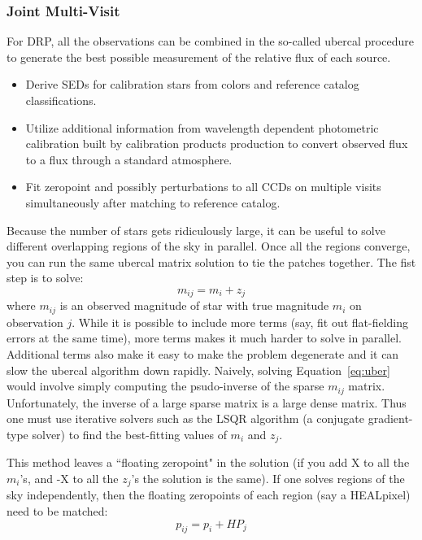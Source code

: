 \subsubsection{Joint Multi-Visit}
\label{sec:acJointPhotometricFit}

For DRP, all the observations can be combined in the so-called ubercal procedure to generate the best possible measurement of the relative flux of each source.

\begin{itemize}
\item Derive SEDs for calibration stars from colors and reference catalog classifications.
\item Utilize additional information from wavelength dependent photometric calibration built by calibration products production to convert observed flux to a flux through a standard atmosphere.
\item Fit zeropoint and possibly perturbations to all CCDs on multiple visits simultaneously after matching to reference catalog.
\end{itemize}

Because the number of stars gets ridiculously large, it can be useful to solve different overlapping regions of the sky in parallel.  Once all the regions converge, you can run the same ubercal matrix solution to tie the patches together.  The fist step is to solve:
\begin{equation} \label{eq:uber}
m_{ij} = m_i + z_j
\end{equation}
where $m_{ij}$ is an observed magnitude of star with true magnitude $m_i$ on observation $j$.  While it is possible to include more terms (say, fit out flat-fielding errors at the same time), more terms makes it much harder to solve in parallel.  Additional terms also make it easy to make the problem degenerate and it can slow the ubercal algorithm down rapidly. Naively, solving Equation~\ref{eq:uber} would involve simply computing the psudo-inverse of the sparse $m_{ij}$ matrix. Unfortunately, the inverse of a large sparse matrix is a large dense matrix.  Thus one must use iterative solvers such as the LSQR algorithm (a conjugate gradient-type solver) to find the best-fitting values of $m_i$ and $z_j$.  

This method leaves a ``floating zeropoint" in the solution (if you add X to all the $m_i$'s, and -X to all the $z_j$'s the solution is the same).  If one solves regions of the sky independently, then the floating zeropoints of each region (say a HEALpixel) need to be matched:
\begin{equation}
p_{ij} = p_i + HP_j
\end{equation}

